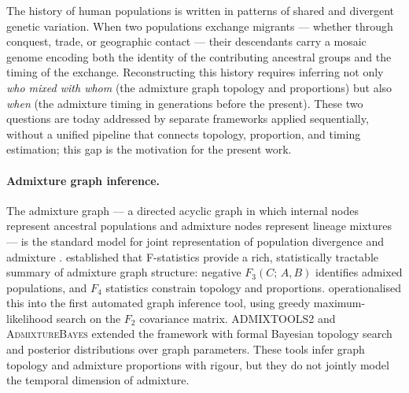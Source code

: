 
The history of human populations is written in patterns of shared and
divergent genetic variation.
When two populations exchange migrants — whether through conquest, trade, or
geographic contact — their descendants carry a mosaic genome encoding
both the identity of the contributing ancestral groups and the timing of
the exchange.
Reconstructing this history requires inferring not only
\emph{who mixed with whom} (the admixture graph topology and proportions)
but also \emph{when} (the admixture timing in generations before the present).
These two questions are today addressed by separate frameworks applied
sequentially, without a unified pipeline that connects topology, proportion,
and timing estimation; this gap is the motivation for the present work.

\paragraph{Admixture graph inference.}
The admixture graph — a directed acyclic graph in which internal nodes
represent ancestral populations and admixture nodes represent lineage mixtures
— is the standard model for joint representation of population divergence and
admixture \citep{Reich2009,Patterson2012}.
\citet{Patterson2012} established that F-statistics provide a rich,
statistically tractable summary of admixture graph structure:
negative $F_3(C;\,A,B)$ identifies admixed populations, and $F_4$ statistics
constrain topology and proportions.
\treemix{} \citep{Pickrell2012} operationalised this into the first automated
graph inference tool, using greedy maximum-likelihood search on the $F_2$
covariance matrix.
\textsc{ADMIXTOOLS2} \citep{Maier2023} and \textsc{AdmixtureBayes}
\citep{Nielsen2023} extended the framework with formal Bayesian topology
search and posterior distributions over graph parameters.
These tools infer graph topology and admixture proportions with rigour,
but they do not jointly model the temporal dimension of admixture.

